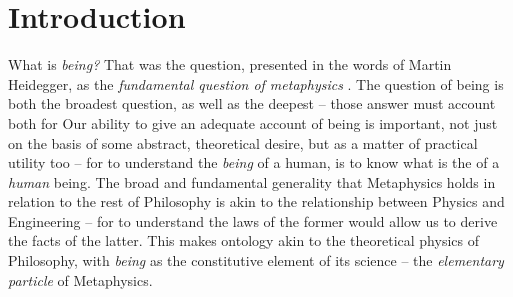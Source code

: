 \chapter{Introduction}



What is \emph{being?}  That was the question, presented in the words of Martin Heidegger, as the \emph{fundamental question of metaphysics} \autocite[1]{Heidegger}. The question of being is both the broadest question, as well as the deepest -- those answer must account both for  Our ability to give an adequate account of being is important, not just on the basis of some abstract, theoretical desire, but as a matter of practical utility too -- for to understand the \emph{being} of a human, is to know what is the  of a \emph{human} being. The broad and fundamental generality that Metaphysics holds in relation to the rest of Philosophy is akin to the relationship between Physics and Engineering -- for to understand the laws of the former would allow us to derive the facts of the latter. This makes ontology akin to the theoretical physics of Philosophy, with \emph{being} as the constitutive element of its science -- the \emph{elementary particle} of Metaphysics.


